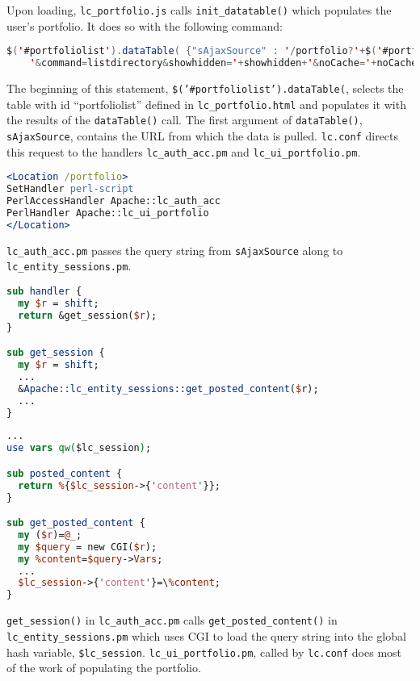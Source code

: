 Upon loading, {\tt lc\_portfolio.js} calls {\tt init\_datatable()} which populates the user's portfolio.  It does so with the following command:

\begin{lstlisting}[language=Java,frame=single,title=lc\_portfolio.js]
$('#portfoliolist').dataTable( {"sAjaxSource" : '/portfolio?'+$('#portfolio').serialize()+
    '&command=listdirectory&showhidden='+showhidden+'&noCache='+noCache,...  
\end{lstlisting}

\begin{sloppypar}
The beginning of this statement, {\tt \$('\#portfoliolist').dataTable(}, selects the table with id ``portfoliolist'' defined in {\tt lc\_portfolio.html} and populates it with the results of the {\tt dataTable()} call.  The first argument of {\tt dataTable()}, {\tt sAjaxSource}, contains the URL from which the data is pulled.  {\tt lc.conf} directs this request to the handlers {\tt lc\_auth\_acc.pm} and {\tt lc\_ui\_portfolio.pm}.
\end{sloppypar}

\begin{lstlisting}[language=apache,frame=single,title=lc.conf]
<Location /portfolio>
SetHandler perl-script
PerlAccessHandler Apache::lc_auth_acc
PerlHandler Apache::lc_ui_portfolio
</Location>
\end{lstlisting}

{\tt lc\_auth\_acc.pm} passes the query string from {\tt sAjaxSource} along to {\tt lc\_entity\_sessions.pm}.

\begin{lstlisting}[language=Perl,frame=single,title=lc\_auth\_acc.pm]
sub handler {
  my $r = shift;
  return &get_session($r);
}

sub get_session {
  my $r = shift;
  ...
  &Apache::lc_entity_sessions::get_posted_content($r);
  ...
}
\end{lstlisting}

\begin{lstlisting}[language=Perl,frame=single,title=lc\_entity\_sessions.pm]
...
use vars qw($lc_session);

sub posted_content {
  return %{$lc_session->{'content'}};
}

sub get_posted_content {
  my ($r)=@_;
  my $query = new CGI($r);
  my %content=$query->Vars;
  ...
  $lc_session->{'content'}=\%content;
}
\end{lstlisting}

{\tt get\_session()} in {\tt lc\_auth\_acc.pm} calls {\tt get\_posted\_content()} in {\tt lc\_entity\_sessions.pm} which uses CGI to load the query string into the global hash variable, {\tt \$lc\_session}.  {\tt lc\_ui\_portfolio.pm}, called by {\tt lc.conf} does most of the work of populating the portfolio.

